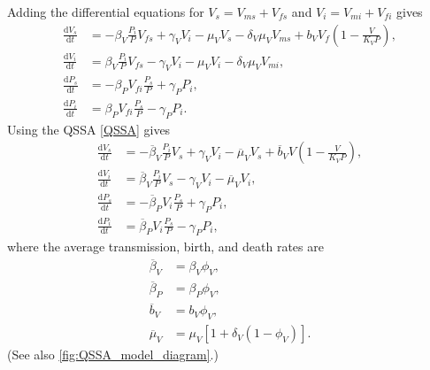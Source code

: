 \documentclass{article}
\newcommand{\md}{\mathrm{d}}
\begin{document}
Adding the differential equations for $V_s = V_{ms} + V_{fs}$ and $V_i
= V_{mi} + V_{fi}$ gives
\begin{equation}
  \begin{split}
    \frac{\md V_s}{\md t}
    &=
    - \beta_V \frac{P_i}{P} V_{fs}
    + \gamma_V V_i
    - \mu_V V_s
    - \delta_V \mu_V V_{ms}
    + b_V V_f \left(1 - \frac{V}{K_V P}\right),
    \\
    \frac{\md V_i}{\md t}
    &=
    \beta_V \frac{P_i}{P} V_{fs}
    - \gamma_V V_i
    - \mu_V V_i
    - \delta_V \mu_V V_{mi},
    \\
    \frac{\md P_s}{\md t}
    &=
    - \beta_P V_{fi} \frac{P_s}{P}
    + \gamma_P P_i,
    \\
   \frac{\md P_i}{\md t}
    &=
    \beta_P V_{fi} \frac{P_s}{P} - \gamma_P P_i.
  \end{split}
\end{equation}
Using the QSSA \eqref{QSSA} gives
\begin{equation}
  \label{odesystem_QSSA}
  \begin{split}
    \frac{\md V_s}{\md t}
    &=
    - \overline{\beta}_V \frac{P_i}{P} V_s
    + \gamma_V V_i
    - \overline{\mu}_V V_s
    + \overline{b}_V V \left(1 - \frac{V}{K_V P}\right),
    \\
    \frac{\md V_i}{\md t}
    &=
    \overline{\beta}_V \frac{P_i}{P} V_s
    - \gamma_V V_i
    - \overline{\mu}_V V_i,
    \\
    \frac{\md P_s}{\md t}
    &=
    - \overline{\beta}_P V_{i} \frac{P_s}{P}
    + \gamma_P P_i,
    \\
    \frac{\md P_i}{\md t}
    &=
    \overline{\beta}_P V_{i} \frac{P_s}{P}
    - \gamma_P P_i,
  \end{split}
\end{equation}
where the average transmission, birth, and death rates are
\begin{equation}
  \begin{split}
    \overline{\beta}_V &= \beta_V \phi_V,
    \\
    \overline{\beta}_P &= \beta_P \phi_V,
    \\
    \overline{b}_V &= b_V \phi_V,
    \\
    \overline{\mu}_V &= \mu_V [1 + \delta_V (1 - \phi_V)].
  \end{split}
\end{equation}
(See also \autoref{fig:QSSA_model_diagram}.)
\end{document}
